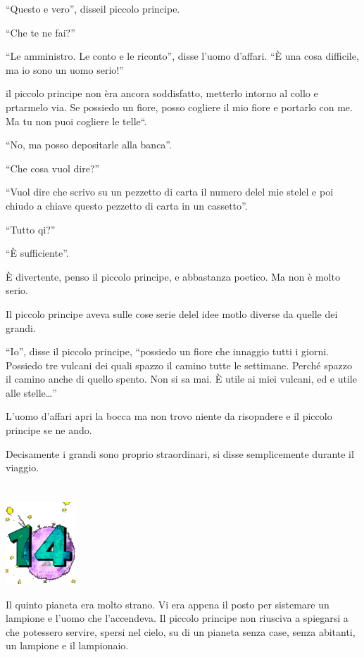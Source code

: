 \documentclass[11pt]{scrbook}
\begin{document}
``Questo e vero'', disseil piccolo principe.

``Che te ne fai?''

``Le amministro. Le conto e le riconto'', disse l'uomo d'affari. ``È una
cosa difficile, ma io sono un uomo serio!''

il piccolo principe non èra ancora soddisfatto, metterlo intorno al
collo e prtarmelo via. Se possiedo un fiore, posso cogliere il mio fiore
e portarlo con me. Ma tu non puoi cogliere le telle``.

``No, ma posso depositarle alla banca''.

``Che cosa vuol dire?''

``Vuol dire che scrivo su un pezzetto di carta il numero delel mie
stelel e poi chiudo a chiave questo pezzetto di carta in un cassetto''.

``Tutto qi?''

``È sufficiente''.

È divertente, penso il piccolo principe, e abbastanza poetico. Ma non è
molto serio.

Il piccolo principe aveva sulle cose serie delel idee motlo diverse da
quelle dei grandi.

``Io'', disse il piccolo principe, ``possiedo un fiore che innaggio
tutti i giorni. Possiedo tre vulcani dei quali spazzo il camino tutte le
settimane. Perché spazzo il camino anche di quello spento. Non si sa
mai. È utile ai miei vulcani, ed e utile alle stelle\ldots{}''

L'uomo d'affari apri la bocca ma non trovo niente da risopndere e il
piccolo principe se ne ando.

Decisamente i grandi sono proprio straordinari, si disse semplicemente
durante il viaggio.

\chapter{}
\begin{center}
\includegraphics{./img/chapter14.png}
\end{center}

Il quinto pianeta era molto strano. Vi era appena il posto per sistemare
un lampione e l'uomo che l'accendeva. Il piccolo principe non riusciva a
spiegarsi a che potessero servire, spersi nel cielo, su di un pianeta
senza case, senza abitanti, un lampione e il lampionaio.
\end{document}
